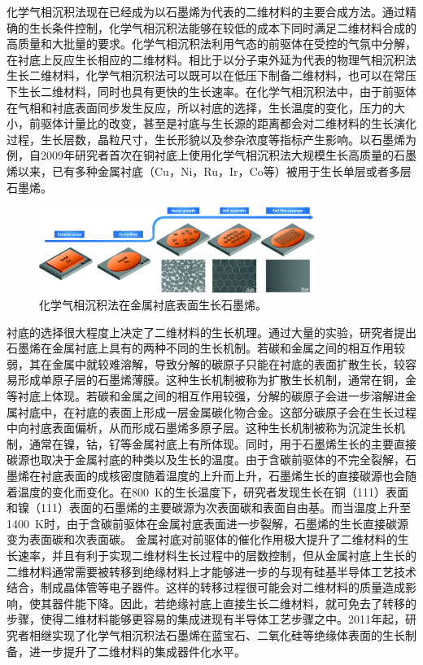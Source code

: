     化学气相沉积法现在已经成为以石墨烯为代表的二维材料的主要合成方法。通过精确的生长条件控制，化学气相沉积法能够在较低的成本下同时满足二维材料合成的高质量和大批量的要求。化学气相沉积法利用气态的前驱体在受控的气氛中分解，在衬底上反应生长相应的二维材料。相比于以分子束外延为代表的物理气相沉积法生长二维材料，化学气相沉积法可以既可以在低压下制备二维材料，也可以在常压下生长二维材料，同时也具有更快的生长速率。在化学气相沉积法中，由于前驱体在气相和衬底表面同步发生反应，所以衬底的选择，生长温度的变化，压力的大小，前驱体计量比的改变，甚至是衬底与生长源的距离都会对二维材料的生长演化过程，生长层数，晶粒尺寸，生长形貌以及参杂浓度等指标产生影响。以石墨烯为例，自2009年研究者首次在铜衬底上使用化学气相沉积法大规模生长高质量的石墨烯以来，已有多种金属衬底（Cu，Ni，Ru，Ir，Co等）被用于生长单层或者多层石墨烯。%

    \begin{figure}
        \includegraphics[width=0.8\textwidth]{pic/INTRO_CVD_graphene_growth.png}
        \caption{化学气相沉积法在金属衬底表面生长石墨烯。}
        \label{}
    \end{figure}

    衬底的选择很大程度上决定了二维材料的生长机理。通过大量的实验，研究者提出石墨烯在金属衬底上具有的两种不同的生长机制。若碳和金属之间的相互作用较弱，其在金属中就较难溶解，导致分解的碳原子只能在衬底的表面扩散生长，较容易形成单原子层的石墨烯薄膜。这种生长机制被称为扩散生长机制，通常在铜，金等衬底上体现。若碳和金属之间的相互作用较强，分解的碳原子会进一步溶解进金属衬底中，在衬底的表面上形成一层金属碳化物合金。这部分碳原子会在生长过程中向衬底表面偏析，从而形成石墨烯多原子层。这种生长机制被称为沉淀生长机制，通常在镍，钴，钌等金属衬底上有所体现。同时，用于石墨烯生长的主要直接碳源也取决于金属衬底的种类以及生长的温度。由于含碳前驱体的不完全裂解，石墨烯在衬底表面的成核密度随着温度的上升而上升，石墨烯生长的直接碳源也会随着温度的变化而变化。在\SI{800}{\kelvin}的生长温度下，研究者发现生长在铜（111）表面和镍（111）表面的石墨烯的主要碳源为次表面碳和表面自由基。而当温度上升至\SI{1400}{\kelvin}时，由于含碳前驱体在金属衬底表面进一步裂解，石墨烯的生长直接碳源变为表面碳和次表面碳。
    金属衬底对前驱体的催化作用极大提升了二维材料的生长速率，并且有利于实现二维材料生长过程中的层数控制，但从金属衬底上生长的二维材料通常需要被转移到绝缘材料上才能够进一步的与现有硅基半导体工艺技术结合，制成晶体管等电子器件。这样的转移过程很可能会对二维材料的质量造成影响，使其器件能下降。因此，若绝缘衬底上直接生长二维材料，就可免去了转移的步骤，使得二维材料能够更容易的集成进现有半导体工艺步骤之中。2011年起，研究者相继实现了化学气相沉积法石墨烯在蓝宝石、二氧化硅等绝缘体表面的生长制备，进一步提升了二维材料的集成器件化水平。

